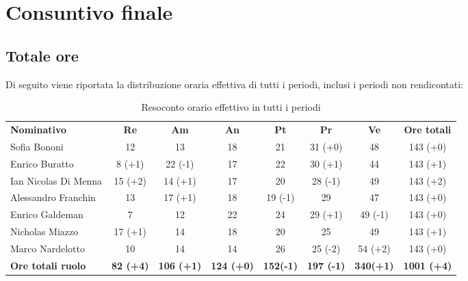 \documentclass[../piano-di-progetto.tex]{subfiles}
\begin{document}














\newpage
\section{Consuntivo finale}

\subsection{Totale ore}
Di seguito viene riportata la distribuzione oraria effettiva di tutti i periodi, inclusi i periodi non rendicontati:


\begin{table}[H]
    \centering
    \begin{tabular}{lccccccc}
      \rowcolor{lightgray}
      \textbf{Nominativo}       & \textbf{Re}      & \textbf{Am} & \textbf{An}      & \textbf{Pt} & \textbf{Pr} & \textbf{Ve} & \textbf{Ore totali} \\
      Sofia Bononi              & 12               & 13                & 18                & 21               & 31 (+0)           & 48               & 143 (+0)           \\
Enrico Buratto            & 8 (+1)           & 22 (-1)           & 17                & 22               & 30 (+1)           & 44               & 143 (+1)           \\
Ian Nicolas Di Menna      & 15 (+2)          & 14 (+1)           & 17                & 20               & 28 (-1)           & 49               & 143 (+2)           \\
Alessandro Franchin       & 13               & 17 (+1)           & 18                & 19 (-1)          & 29                & 47               & 143 (+0)           \\
Enrico Galdeman           & 7                & 12                & 22                & 24               & 29 (+1)           & 49 (-1)          & 143 (+0)           \\
Nicholas Miazzo           & 17 (+1)          & 14                & 18                & 20               & 25                & 49               & 143 (+1)           \\
Marco Nardelotto          & 10               & 14                & 14                & 26               & 25 (-2)           & 54 (+2)          & 143 (+0)           \\
\textbf{Ore totali ruolo} & \textbf{82 (+4)} & \textbf{106 (+1)} & \textbf{124 (+0)} & \textbf{152(-1)} & \textbf{197 (-1)} & \textbf{340(+1)} & \textbf{1001 (+4)}
    \end{tabular}
    \caption{Resoconto orario effettivo in tutti i periodi}
  \end{table}
  
\end{document}

